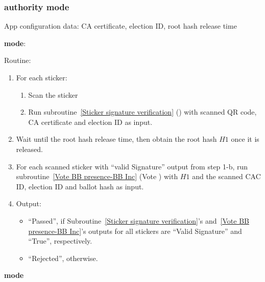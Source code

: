 \documentclass{article}
\begin{document}
\subsubsection{\remoteVotingCenter{} authority mode}


App configuration data: CA certificate, election ID, root hash release time

\textbf{\BBInclusionCheck{} mode}:


Routine:
\begin{enumerate}
    \item For each sticker:
    \begin{enumerate}
        \item Scan the sticker
        \item Run subroutine~\ref{Sticker signature verification} (\StickersignatureVerification{}) with scanned QR code, CA certificate and election ID as input.
    \end{enumerate}
    \item Wait until the root hash release time, then obtain the root hash $H1$ once it is released.
    \item For each scanned sticker with ``valid Signature'' output from step 1-b, run subroutine~\ref{Vote BB presence-BB Inc} (Vote \BBInclusionCheck{}) with  $H1$ and the scanned CAC ID, election ID and ballot hash as input.
    \item Output:
    \begin{itemize}
        \item ``Passed'',  if Subroutine~\ref{Sticker signature verification}'s and~\ref{Vote BB presence-BB Inc}'s outputs for all stickers are ``Valid Signature'' and ``True'', respectively.
        \item ``Rejected'', otherwise.
    \end{itemize}
\end{enumerate}


\textbf{\StickerBBUpload{}{} mode}
\end{document}
